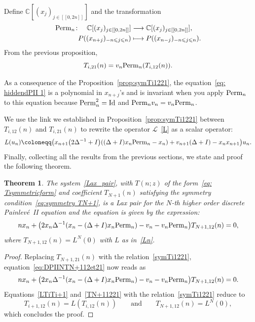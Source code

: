 \documentclass[pdftex]{sigma}%
\numberwithin{equation}{section}
\newtheorem{Theorem}{Theorem}[section]
\newcommand{\C}{\mathbb{C}}
\begin{document}
Define $\C[(x_j)_{j\in[[0,2n]]}]$ and the transformation
\begin{align*}
{\rm Perm}_n\colon\quad \C[(x_j)_{j\in[[0,2n]]}]&\longrightarrow\C[(x_j)_{j\in[[0,2n]]}],
\\
P((x_{n+j})_{-n\leqslant j\leqslant n})&\longmapsto P((x_{n-j})_{-n\leqslant j\leqslant n}).
\end{align*}
	From the previous proposition,
\begin{equation}
		 T_{i,21}(n)=v_n{\rm Perm}_n(T_{i,12}(n)).
		 \label{symTi1221}
\end{equation}

	\begin{Remark}
		As a consequence of the Proposition~\ref{prop:symTi1221}, the equation~\eqref{eq: hiddendPII 1} is a polynomial in $x_{n+j}$'s and is invariant when you apply ${\rm Perm}_n$ to this equation because ${\rm Perm}_n^2={\rm Id}$ and ${\rm Perm}_nv_n=v_n{\rm Perm}_n$.
	\end{Remark}
	We use the link we established in Proposition~\ref{prop:symTi1221} between $T_{i,12}(n)$ and $T_{i,21}(n)$ to rewrite the operator $\mathcal{L}$~\eqref{L} as a scalar operator:
	\begin{equation}
		L(u_n)\coloneqq \big(x_{n+1}\big(2\Delta^{-1}+I\big)((\Delta+I)x_{n}{\rm Perm}_n-x_n)+v_{n+1}(\Delta+I)-x_nx_{n+1}\big)u_n.
		\label{Ln}
	\end{equation}
Finally, collecting all the results from the previous sections, we state and proof the following theorem.
\begin{Theorem}
\label{thm:discretePIIequation}
The system~\eqref{Lax_pair}, with $T(n;z)$ of the form~\eqref{eq: Tsymmetricform} and coefficient $T_{N+1}(n)$ satisfying the symmetry condition~\eqref{eq:symmetry TN+1}, is a Lax pair for the $N$-th higher order discrete Painlev\'e~II equation and the equation is given by the expression:
\begin{equation}
\label{eq:eqdPIIhierarchy}
nx_n+\big(2x_n\Delta^{-1}(x_n-(\Delta+I)x_{n}{\rm Perm}_n)-v_n-v_n{\rm Perm}_n\big)T_{N+1,12}(n)=0,
\end{equation}
where $T_{N+1,12}(n)={L}^N(0)$ with $L$ as in~\eqref{Ln}.
\end{Theorem}

\begin{proof}
Replacing $T_{N+1,21}(n)$ with the relation~\eqref{symTi1221}, equation~\eqref{eq:DPIINTN+112et21} now reads as
\begin{equation*}
nx_n+\big(2x_n\Delta^{-1}(x_n-(\Delta+I)x_{n}{\rm Perm}_n)-v_n-v_n{\rm Perm}_n\big)T_{N+1,12}(n)=0.
\end{equation*}
Equations~\eqref{LTiTi+1} and~\eqref{TN+11221} with the relation~\eqref{symTi1221} reduce to
\begin{equation*}
T_{i+1,12}(n)=L(T_{i,12}(n))\qquad \text{and}\qquad
T_{N+1,12}(n)={L}^N(0),
\end{equation*}
which concludes the proof.
\end{proof}
\end{document}
